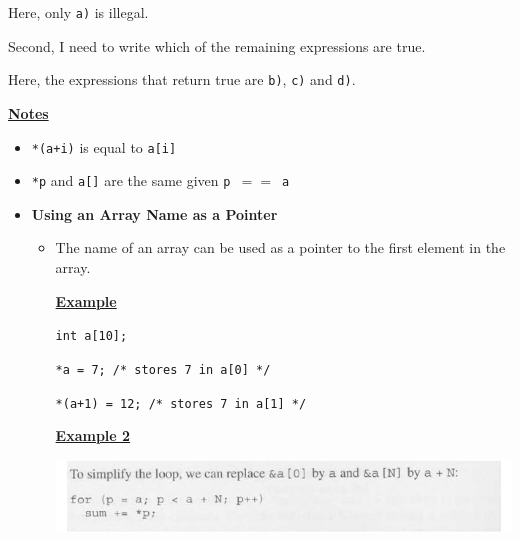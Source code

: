 \documentclass[12pt]{article}
\begin{document}
\begin{enumerate}[1.]
    \bigskip

    Here, only \texttt{a)} is illegal.

    \bigskip

    Second, I need to write which of the remaining expressions are true.

    \bigskip

    Here, the expressions that return true are \texttt{b)}, \texttt{c)} and \texttt{d)}.

    \bigskip

    \underline{\textbf{Notes}}

    \begin{itemize}
        \item \texttt{*(a+i)} is equal to \texttt{a[i]}
        \item \texttt{*p} and \texttt{a[]} are the same given \texttt{p $==$ a}
        \item \textbf{Using an Array Name as a Pointer}

        \begin{itemize}
            \item The name of an array can be used as a pointer to the first element in the array.

            \bigskip

            \underline{\textbf{Example}}

            \bigskip

            \texttt{int a[10];}

            \bigskip

            \texttt{*a = 7; /* stores 7 in a[0] */}

            \bigskip

            \texttt{*(a+1) = 12; /* stores 7 in a[1] */}

            \bigskip

            \underline{\textbf{Example 2}}

            \bigskip

            \begin{center}
            \includegraphics[width=\linewidth]{images/review_5_solution_6.png}
            \end{center}

        \end{itemize}
    \end{itemize}


\end{enumerate}
\end{document}
